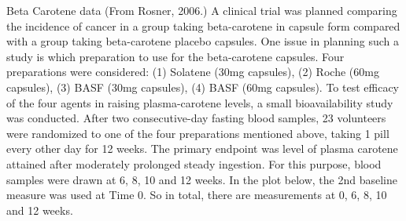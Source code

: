 \documentclass[
  9pt,
  ignorenonframetext,
]{beamer}
\begin{document}
\begin{frame}{Beta Carotene data (From Rosner, 2006.)}
\protect\hypertarget{beta-carotene-data-from-rosner-2006.}{}
A clinical trial was planned comparing the incidence of cancer in a
group taking beta-carotene in capsule form compared with a group taking
beta-carotene placebo capsules. One issue in planning such a study is
which preparation to use for the beta-carotene capsules. Four
preparations were considered: (1) Solatene (30mg capsules), (2) Roche
(60mg capsules), (3) BASF (30mg capsules), (4) BASF (60mg capsules). To
test efficacy of the four agents in raising plasma-carotene levels, a
small bioavailability study was conducted. After two consecutive-day
fasting blood samples, 23 volunteers were randomized to one of the four
preparations mentioned above, taking 1 pill every other day for 12
weeks. The primary endpoint was level of plasma carotene attained after
moderately prolonged steady ingestion. For this purpose, blood samples
were drawn at 6, 8, 10 and 12 weeks. In the plot below, the 2nd baseline
measure was used at Time 0. So in total, there are measurements at 0, 6,
8, 10 and 12 weeks.
\end{frame}
\end{document}

